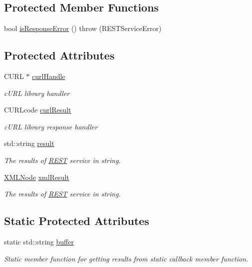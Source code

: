 \subsection*{Protected Member Functions}
\begin{DoxyCompactItemize}
\item 
bool \hyperlink{classunisys_1_1REST_a5ea35991beea9eb0f3cefb69e47b85fa}{is\-Response\-Error} ()  throw (\-R\-E\-S\-T\-Service\-Error)
\end{DoxyCompactItemize}
\subsection*{Protected Attributes}
\begin{DoxyCompactItemize}
\item 
C\-U\-R\-L $\ast$ \hyperlink{classunisys_1_1REST_a0883a12f6ff081295982f74bd6d1aa46}{curl\-Handle}
\begin{DoxyCompactList}\small\item\em c\-U\-R\-L library handler \end{DoxyCompactList}\item 
C\-U\-R\-Lcode \hyperlink{classunisys_1_1REST_ab8e5c6e4ee484f86d09ce6caaf6ee08f}{curl\-Result}
\begin{DoxyCompactList}\small\item\em c\-U\-R\-L library response handler \end{DoxyCompactList}\item 
std\-::string \hyperlink{classunisys_1_1REST_a4bb59e07505ee0bcb138fc662d4bcb68}{result}
\begin{DoxyCompactList}\small\item\em The results of \hyperlink{classunisys_1_1REST}{R\-E\-S\-T} service in string. \end{DoxyCompactList}\item 
\hyperlink{structXMLNode}{X\-M\-L\-Node} \hyperlink{classunisys_1_1REST_a8ad94e0f4cde502eafef44da193bdad0}{xml\-Result}
\begin{DoxyCompactList}\small\item\em The results of \hyperlink{classunisys_1_1REST}{R\-E\-S\-T} service in string. \end{DoxyCompactList}\end{DoxyCompactItemize}
\subsection*{Static Protected Attributes}
\begin{DoxyCompactItemize}
\item 
static std\-::string \hyperlink{classunisys_1_1REST_a473b61d2f981b478377b6c4f3ec6784b}{buffer}
\begin{DoxyCompactList}\small\item\em Static member function for getting results from static callback member function. \end{DoxyCompactList}\end{DoxyCompactItemize}


